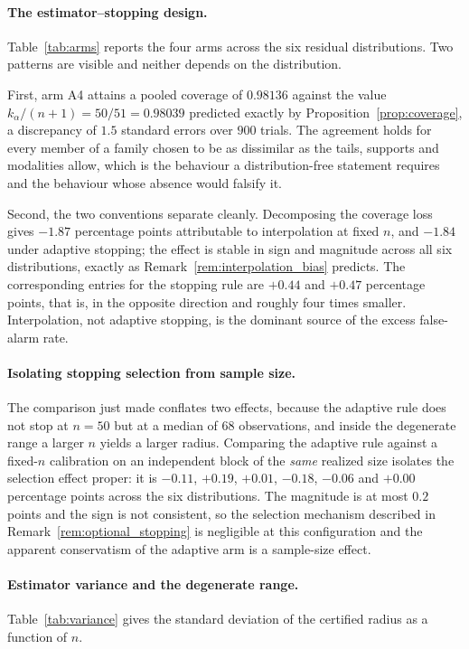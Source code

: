 \documentclass[a4paper]{cas-sc}
\begin{document}
\paragraph{The estimator--stopping design.}
Table~\ref{tab:arms} reports the four arms across the six residual
distributions. Two patterns are visible and neither depends on the
distribution.



First, arm A4 attains a pooled coverage of \(0.98136\) against the value
\(k_\alpha/(n+1)=50/51=0.98039\) predicted exactly by
Proposition~\ref{prop:coverage}, a discrepancy of \(1.5\) standard errors over
\(900\) trials. The agreement holds for every member of a family chosen to be
as dissimilar as the tails, supports and modalities allow, which is the
behaviour a distribution-free statement requires and the behaviour whose
absence would falsify it.

Second, the two conventions separate cleanly. Decomposing the coverage loss
gives \(-1.87\) percentage points attributable to interpolation at fixed
\(n\), and \(-1.84\) under adaptive stopping; the effect is stable in sign and
magnitude across all six distributions, exactly as
Remark~\ref{rem:interpolation_bias} predicts. The corresponding entries for
the stopping rule are \(+0.44\) and \(+0.47\) percentage points, that is, in
the opposite direction and roughly four times smaller. Interpolation, not
adaptive stopping, is the dominant source of the excess false-alarm rate.

\paragraph{Isolating stopping selection from sample size.}
The comparison just made conflates two effects, because the adaptive rule
does not stop at \(n=50\) but at a median of \(68\) observations, and inside
the degenerate range a larger \(n\) yields a larger radius. Comparing the
adaptive rule against a fixed-\(n\) calibration on an independent block of the
\emph{same} realized size isolates the selection effect proper: it is
\(-0.11\), \(+0.19\), \(+0.01\), \(-0.18\), \(-0.06\) and \(+0.00\)
percentage points across the six distributions. The magnitude is at most
\(0.2\) points and the sign is not consistent, so the selection mechanism
described in Remark~\ref{rem:optional_stopping} is negligible at this
configuration and the apparent conservatism of the adaptive arm is a
sample-size effect.

\paragraph{Estimator variance and the degenerate range.}
Table~\ref{tab:variance} gives the standard deviation of the certified radius
as a function of \(n\).
\end{document}
